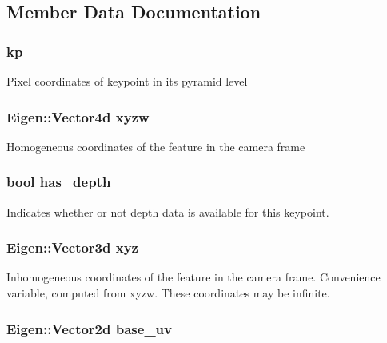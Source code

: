 \subsection{Member Data Documentation}
\hypertarget{classfovis_1_1KeypointData_a735862645891486a2f4d30e0c41a6ead}{
\subsubsection[{kp}]{ {\bf kp}}}
\label{classfovis_1_1KeypointData_a735862645891486a2f4d30e0c41a6ead}
Pixel coordinates of keypoint in its pyramid level \hypertarget{classfovis_1_1KeypointData_a3429cc278fa5be99ed3308ca5852d9e7}{
\subsubsection[{xyzw}]{\setlength{\rightskip}{0pt plus 5cm}Eigen::Vector4d {\bf xyzw}}}
\label{classfovis_1_1KeypointData_a3429cc278fa5be99ed3308ca5852d9e7}
Homogeneous coordinates of the feature in the camera frame \hypertarget{classfovis_1_1KeypointData_a896725c2a47d00963355b4bb31531af8}{
\subsubsection[{has\_\-depth}]{\setlength{\rightskip}{0pt plus 5cm}bool {\bf has\_\-depth}}}
\label{classfovis_1_1KeypointData_a896725c2a47d00963355b4bb31531af8}
Indicates whether or not depth data is available for this keypoint. \hypertarget{classfovis_1_1KeypointData_a3718bd38e2607f9ae26d6b72ee203bb2}{
\subsubsection[{xyz}]{\setlength{\rightskip}{0pt plus 5cm}Eigen::Vector3d {\bf xyz}}}
\label{classfovis_1_1KeypointData_a3718bd38e2607f9ae26d6b72ee203bb2}
Inhomogeneous coordinates of the feature in the camera frame. Convenience variable, computed from xyzw. These coordinates may be infinite. \hypertarget{classfovis_1_1KeypointData_ac37015bdf7c90c14e5563d6772bac549}{
\subsubsection[{base\_\-uv}]{\setlength{\rightskip}{0pt plus 5cm}Eigen::Vector2d {\bf base\_\-uv}}}
